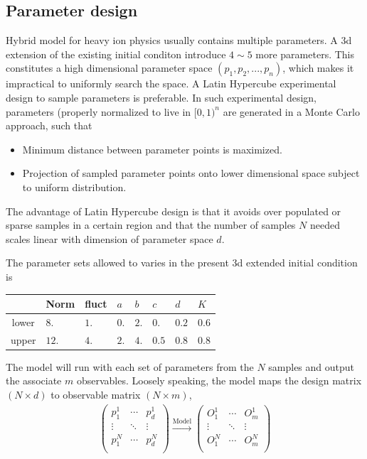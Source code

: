 \documentclass[aps,prl,twocolumn,groupedaddress]{revtex4-1}
\begin{document}
	\subsection{Parameter design}
	Hybrid model for heavy ion physics usually contains multiple parameters. 
	A 3d extension of the existing initial conditon introduce $4\sim5$ more parameters. 
	This constitutes a high dimensional parameter space $(p_1, p_2, ..., p_n)$, which makes it impractical to uniformly search the space. 
	A Latin Hypercube experimental design to sample parameters is preferable. 
	In such experimental design, parameters (properly normalized to live in $[0,1)^n$ are generated in a Monte Carlo approach, such that
	\begin{itemize}
		\item Minimum distance between parameter points is maximized.
		\item Projection of sampled parameter points onto lower dimensional space subject to uniform distribution.
	\end{itemize}
	The advantage of Latin Hypercube design is that it avoids over populated or sparse samples in a certain region and that the number of samples $N$ needed scales linear with dimension of parameter space $d$.
	
	The parameter sets allowed to varies in the present 3d extended initial condition is 
	\begin{center}
	\begin{tabularx}{0.45\textwidth}{c*{7}{Y}}
		\toprule[1pt]
		 & Norm	& fluct	& $a$ & $b$ & $c$ & $d$ & $K$ \\
		\midrule[0.5pt]
		lower & $8.$		&  $1.$	&	$0.$&	 $2.$ & $0.$ & $0.2$ & $0.6$ \\
		upper	& $12.$		&  $4.$	&	$2.$& $4.$ & $0.5$ & $0.8$ & $0.8$ \\
		\bottomrule[1pt]
	\end{tabularx}
	\end{center}
	The model will run with each set of parameters from the $N$ samples and output the associate $m$ observables. Loosely speaking, the model maps the design matrix $(N \times d)$ to observable matrix $(N \times m)$,
	\begin{eqnarray}\label{design-obs}
	\left(\begin{array}{ccc}
	p_{1}^{1}  & \cdots & p_{d}^{1}\\
	\vdots  & \ddots & \vdots\\
	p_{1}^{N}  & \cdots & p_{d}^{N}\\
	\end{array}\right)
	\xrightarrow{\textrm{Model}} 
	\left(\begin{array}{ccc}
	O_{1}^{1}  & \cdots & O_{m}^{1}\\
	\vdots  & \ddots & \vdots\\
	O_{1}^{N}  & \cdots & O_{m}^{N}\\
	\end{array}\right)
	\end{eqnarray}
	
\end{document}
